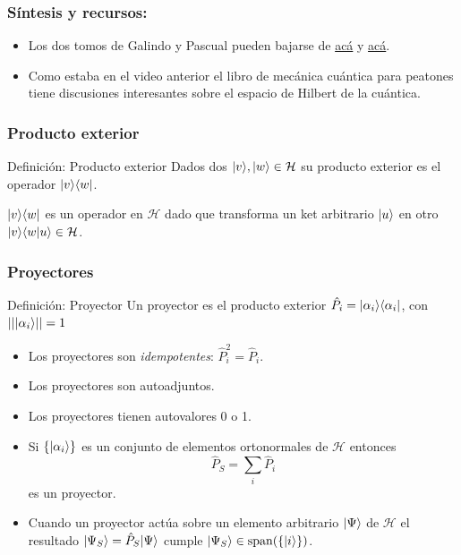 \documentclass{beamer}
\begin{document}
    
    
    \begin{frame}
    \frametitle{Síntesis y recursos:}
    
    \begin{itemize}
    \item Los dos tomos de Galindo y Pascual pueden bajarse de \href{acá}{acá} y \href{acá}{acá}.  
    \item Como estaba en el video anterior el libro de mecánica cuántica para peatones tiene discusiones interesantes sobre el espacio de Hilbert de la cuántica.
    \end{itemize}
    \end{frame}

    
\begin{frame}
    \frametitle{Producto exterior}
    
    \begin{block}{Definición: Producto exterior}
        Dados dos $| v \rangle,| w \rangle\in\mathcal{H}$ su producto exterior es el operador $| v \rangle\langle w |$.
    \end{block}
    $| v \rangle\langle w |$ es un operador en $\mathcal{H}$ dado que transforma un ket arbitrario $| u \rangle$ en otro $| v \rangle\langle w | u \rangle\in \mathcal{H}$.
    
\end{frame} 

\begin{frame}
    \frametitle{Proyectores}

    \begin{block}{Definición: Proyector}
        Un proyector es el producto exterior $\hat{P_i}=| \alpha_i \rangle\langle \alpha_i |$, con $||| \alpha_i \rangle||=1$
    \end{block}
    \begin{itemize}
        \item Los proyectores son {\em idempotentes}: $\hat{P}_i^2=\hat{P}_i$.
        \item Los proyectores son autoadjuntos.
        \item Los proyectores tienen autovalores 0 o 1.
        \item Si $\{| \alpha_i \rangle\}$ es un conjunto de elementos ortonormales de $\mathcal{H}$ entonces
        \[ \hat{P}_S = \sum_i \hat{P}_i \] 
        es un proyector.
        \item Cuando un proyector actúa sobre un elemento arbitrario $| \Psi \rangle$ de $\mathcal{H}$ el resultado $| \Psi_S \rangle=\hat{P}_S| \Psi \rangle$ cumple $| \Psi_S \rangle\in\mathrm{span}(\{| i \rangle\})$.
    \end{itemize}
\end{frame} 
\end{document}
